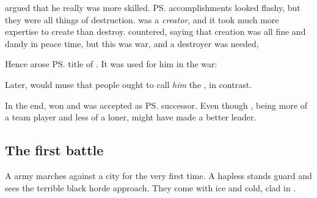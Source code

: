 \Secherdamon{} argued that he really was more skilled. 
\ps{\Ishnaruchaefir} accomplishments looked flashy, but they were all things of destruction. 
\Secherdamon{} was a \emph{creator}, and it took much more expertise to create than destroy. 
\Ishnaruchaefir{} countered, saying that creation was all fine and dandy in peace time, but this was war, and a destroyer was needed, 

Hence arose \ps{\Ishnaruchaefir} title of . 
It was used for him in the war: 
\begin{prose}
\end{prose}

Later, \Secherdamon{} would muse that people ought to call \emph{him} the , in contrast. 

In the end, \Ishnaruchaefir{} won and was accepted as \ps{\Nexagglachel} successor. 
Even though \Secherdamon, being more of a team player and less of a loner, might have made a better leader. 











\subsection{The first battle}
A \resphan{} army marches against a \draconic{} city for the very first time. 
A hapless \scatha{} stands guard and sees the terrible black horde approach. 
They come with ice and cold, clad in . 


